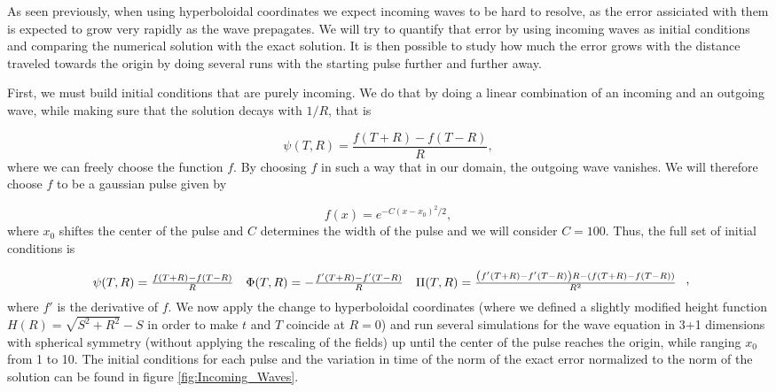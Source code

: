 As seen previously, when using hyperboloidal coordinates we expect incoming waves to be hard to resolve, as the error assiciated with them is expected to grow very rapidly as the wave prepagates. We will try to quantify that error by using incoming waves as initial conditions and comparing the numerical solution with the exact solution. It is then possible to study how much the error grows with the distance traveled towards the origin by doing several runs with the starting pulse further and further away.

First, we must build initial conditions that are purely incoming. We do that by doing a linear combination of an incoming and an outgoing wave, while making sure that the solution decays with $1/R$, that is

\begin{equation}
    \psi(T,R) = \frac{f(T+R) - f(T-R)}{R},
\end{equation}
%
where we can freely choose the function $f$. By choosing $f$ in such a way that in our domain, the outgoing wave vanishes. We will therefore choose $f$ to be a gaussian pulse given by

\begin{equation}
    f(x) = e^{-C (x - x_0)^2/2},
\end{equation}
%
where $x_0$ shiftes the center of the pulse and $C$ determines the width of the pulse and we will consider $C = 100$. Thus, the full set of initial conditions is 

\begin{equation}
    \begin{array}{c c c}
        \psi(T,R) = \frac{f(T+R) - f(T-R)}{R} & \Phi(T,R) = -\frac{f'(T+R) - f'(T-R)}{R} & \Pi(T,R) = \frac{\left(f'(T+R) - f'(T-R)\right)R - \left(f(T+R) - f(T-R)\right)}{R^2}
    \end{array} \; ,
    \label{eq:Incoming_initial_conditions}
\end{equation}
%
where $f'$ is the derivative of $f$. We now apply the change to hyperboloidal coordinates (where we defined a slightly modified height function $H(R) = \sqrt{S^2 + R^2} - S$ in order to make $t$ and $T$ coincide at $R=0$) and run several simulations for the wave equation in 3+1 dimensions with spherical symmetry (without applying the rescaling of the fields) up until the center of the pulse reaches the origin, while ranging $x_0$ from 1 to 10. The initial conditions for each pulse and the variation in time of the norm of the exact error normalized to the norm of the solution can be found in figure \ref{fig:Incoming_Waves}. 

